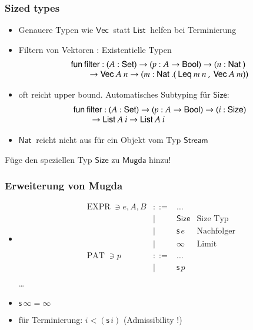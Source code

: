 \documentclass[12pt,red,serif,mathserif]{beamer}
\newcommand{\Set}{\mathsf{Set}}
\newcommand{\s}{\mathsf{s}\,}
\newcommand{\Size}{\mathsf{Size}}
\newcommand{\fun}{\mathsf{fun}\:}
\newcommand{\Nat}{\mathsf{Nat}\:}
\newcommand{\Bool}{\mathsf{Bool}}
\newcommand{\List}{\mathsf{List}\:}
\newcommand{\vVec}{\mathsf{Vec}\:}
\newcommand{\Stream}{\mathsf{Stream}\:}
\newcommand{\filter}{\mathsf{filter}}
\newcommand{\tLeq}{\mathsf{Leq}\:}
\newcommand{\ra}{\rightarrow}
\newcommand{\spcx}{\hspace*{8mm}}
\newcommand{\mugda}{\textsf{Mugda} }
\newcommand{\opn}[1]{\operatorname{#1}}
\newcommand{\Expr}{\opn{EXPR}}
\newcommand{\Pat}{\opn{PAT}}
\begin{document}
\frame
{

\frametitle{ Sized types }
\begin{itemize}
\item
Genauere Typen wie $\vVec$ statt $\List$ helfen bei Terminierung
\item Filtern von Vektoren : Existentielle Typen
\[
\begin{array}{l} 
\fun \filter : (A : \Set ) \ra (p : A \ra \Bool ) \ra (n : \Nat ) \\
\spcx \ra \vVec A \: n \ra (m : \Nat . (\: \tLeq m \: n \:, \: \vVec A \: m))
\end{array}
\] 
\item
oft reicht upper bound. Automatisches Subtyping f\"ur $\Size$:
\[
\begin{array}{l} 
\fun \filter : (A : \Set ) \ra (p : A \ra \Bool ) \ra (i : \Size ) \\
\spcx \ra \List A \: i \ra \List A \: i 
\end{array}   
\]
\item
$\Nat$ reicht nicht aus f\"ur ein Objekt vom Typ $\Stream$
\end{itemize}

F\"uge den speziellen Typ $\Size$ zu $\mugda$ hinzu!

}

\frame
{

\frametitle{ Erweiterung von Mugda }

\begin{itemize}
\item
\[
\begin{array}{lrll}
\Expr \ni e,A,B & ::= & \ldots & \\
& \mid & \Size & \mbox{Size Typ} \\
& \mid & \s e  & \mbox{Nachfolger}\\ 
& \mid & \infty & \mbox{Limit}\\
\Pat \ni p & ::= & \ldots & \\
& \mid & \s p & \\
\end{array}
\]
\dots
\vspace*{0.2cm}
\item
$\s \infty = \infty$ 
\vspace*{0.2cm}
\item
f\"ur Terminierung: $i < (\s i)$ (Admissibility !) 
\end{itemize}
}
\end{document}
